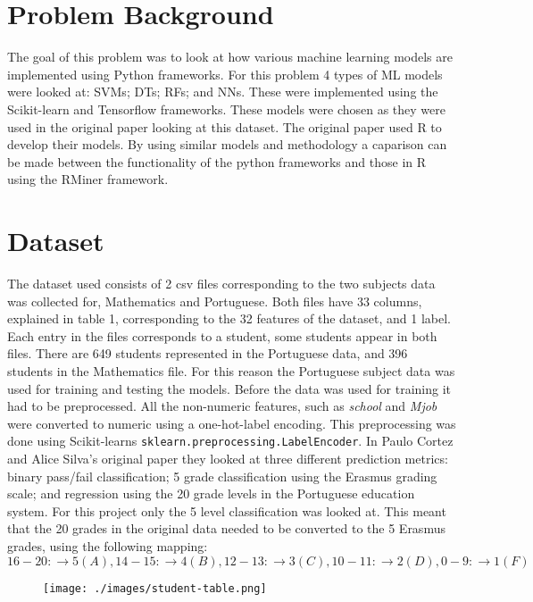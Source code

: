 \documentclass[12pt,a4paper,titlepage,twoside]{report}
\begin{document}
\section{Problem Background}
	 The goal of this problem was to look at how various machine learning models are implemented using Python frameworks. For this problem 4 types of ML models were looked at: SVMs; DTs; RFs; and NNs. These were implemented using the Scikit-learn and Tensorflow frameworks. These models were chosen as they were used in the original paper looking at this dataset\cite{student-dataset}. The original paper used R to develop their models. By using similar models and methodology a caparison can be made between the functionality of the python frameworks and those in R using the RMiner framework. 
	
\section{Dataset}
	The dataset used consists of 2 csv files corresponding to the two subjects data was collected for, Mathematics and Portuguese. Both files have 33 columns, explained in table 1, corresponding to the 32 features of the dataset, and 1 label. Each entry in the files corresponds to a student, some students appear in both files. There are 649 students represented in the Portuguese data, and 396 students in the Mathematics file. For this reason the Portuguese subject data was used for training and testing the models. Before the data was used for training it had to be preprocessed. All the non-numeric features, such as \textit{school} and \textit{Mjob} were converted to numeric using a one-hot-label encoding.  This preprocessing was done using Scikit-learns \texttt{sklearn.preprocessing.LabelEncoder}. In Paulo Cortez and Alice Silva's original paper\cite{student-dataset} they looked at three different prediction metrics: binary pass/fail classification; 5 grade classification using the Erasmus grading scale; and regression using the 20 grade levels in the Portuguese education system. For this project only the 5 level classification was looked at. This meant that the 20 grades in the original data needed to be converted to the 5 Erasmus grades, using the following mapping: $16-20 :\rightarrow 5 (A), 14-15 :\rightarrow 4 (B), 12-13 :\rightarrow 3 (C), 10-11 :\rightarrow 2 (D), 0-9 :\rightarrow 1 (F)$
	\begin{figure}[t]
  		\centering
  		\texttt{[image: ./images/student-table.png]}
  		\label{fig:student-data}
	\end{figure}\\
\end{document}
